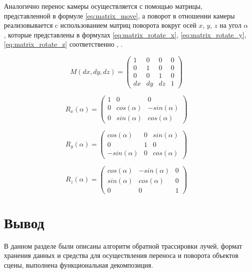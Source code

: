 Аналогично перенос камеры осуществляется с помощью матрицы, представленной в формуле \ref{eq:matrix_move}, а поворот в отношении камеры реализовывается c использованием матриц поворота вокруг осей $x$, $y$, $z$ на угол $\alpha$, которые представлены в формулах \ref{eq:matrix_rotate_x}, \ref{eq:matrix_rotate_y}, \ref{eq:matrix_rotate_z} соответственно \cite{куров}, \cite{боресков}.

\begin{equation}\label{eq:matrix_move}
	M(dx, dy, dz) = \begin{pmatrix}
		1 & 0 & 0 & 0 \\
		0 & 1 & 0 & 0 \\
		0 & 0 & 1 & 0 \\
		dx & dy & dz & 1
	\end{pmatrix}
\end{equation}

\begin{equation}\label{eq:matrix_rotate_x}
	R_x(\alpha) = \begin{pmatrix}
		1 & 0 & 0 \\
		0 & cos(\alpha) & -sin(\alpha) \\
		0 & sin(\alpha) & cos(\alpha)
	\end{pmatrix}
\end{equation}

\begin{equation}\label{eq:matrix_rotate_y}
	R_y(\alpha) = \begin{pmatrix}
		cos(\alpha) & 0 & sin(\alpha) \\
		0 & 1 & 0 \\
		-sin(\alpha) & 0 & cos(\alpha)
	\end{pmatrix}
\end{equation}

\begin{equation}\label{eq:matrix_rotate_z}
	R_z(\alpha) = \begin{pmatrix}
		cos(\alpha) & -sin(\alpha) & 0 \\
		sin(\alpha) & cos(\alpha) & 0 \\
		0 & 0 & 1
	\end{pmatrix}
\end{equation}

\section*{Вывод}

В данном разделе были описаны алгоритм обратной трассировки лучей, формат хранения данных и средства для осуществления переноса и поворота объектов сцены, выполнена функциональная декомпозиция.